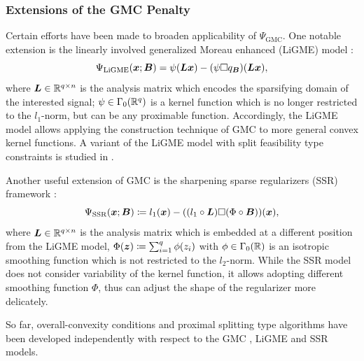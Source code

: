 \documentclass[lettersize,journal]{IEEEtran}
\theoremstyle{plain}%
\theoremstyle{definition}
\theoremstyle{remark}
\begin{document}
\noindent
\subsubsection{Extensions of the GMC Penalty}
Certain efforts have been made to broaden applicability of $\Psi_{\mathrm{GMC}}$. One notable extension is the linearly involved generalized Moreau enhanced (LiGME) model \cite{abe2019,abe2020}:
\begin{equation}
\Psi_{\text{LiGME}}(\bm{x};\bm{B})= \psi(\bm{L} \bm{x})-(\psi\Box q_{\bm{B}})(\bm{L} \bm{x}),
\end{equation}
where $\bm{L}\in\mathbb{R}^{q\times n}$ is the analysis matrix which encodes the sparsifying domain of the interested signal; $\psi\in\Gamma_0(\mathbb{R}^q)$ is a kernel function which is no longer restricted to the $l_1$-norm, but can be any proximable function. Accordingly, the LiGME model allows applying the construction technique of GMC to more general convex kernel functions. A variant of the LiGME model with split feasibility type constraints is studied in \cite{yata2021}. 

Another useful extension of GMC is the sharpening sparse regularizers (SSR) framework \cite{alshabili2021}:
\begin{equation}
\Psi_{\text{SSR}}(\bm{x};\bm{B})\coloneqq l_1(\bm{x})-((l_1\circ \bm{L})\Box (\Phi\circ \bm{B}))(\bm{x}),
\end{equation}
where $\bm{L}\in\mathbb{R}^{q\times n}$ is the analysis matrix which is embedded at a different position from the LiGME model, $\Phi(\bm{z})\coloneqq \sum_{i=1}^q \phi(z_i)$ with $\phi\in\Gamma_0(\mathbb{R})$ is an isotropic smoothing function which is not restricted to the $l_2$-norm. While the SSR model does not consider variability of the kernel function, it allows adopting different smoothing function $\Phi$, thus can adjust the shape of the regularizer more delicately. 

So far, overall-convexity conditions and proximal splitting type \cite{combettes2011} algorithms have been developed independently with respect to the GMC \cite{selesnick2017}, LiGME \cite{abe2020} and SSR \cite{alshabili2021} models.
\end{document}
